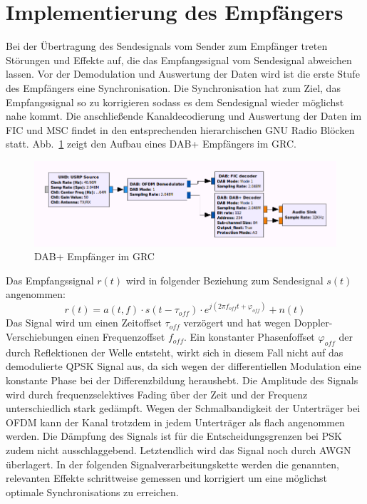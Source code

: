 \let\conjugatet\overline
\section{Implementierung des Empfängers}
\label{sec:impl_des_receivers}
Bei der Übertragung des Sendesignals vom Sender zum Empfänger treten Störungen und Effekte auf, die das Empfangssignal vom Sendesignal abweichen lassen. Vor der Demodulation und Auswertung der Daten wird ist die erste Stufe des Empfängers eine Synchronisation. Die Synchronisation hat zum Ziel, das Empfangssignal so zu korrigieren sodass es dem Sendesignal wieder möglichst nahe kommt. Die anschließende Kanaldecodierung und Auswertung der Daten im FIC und MSC findet in den entsprechenden hierarchischen GNU Radio Blöcken statt. Abb.~\ref{fig:grc_receiver} zeigt den Aufbau eines DAB+ Empfängers im GRC.

\begin{figure}[h]
\centering
  \includegraphics[width=\textwidth]{figures/GRC_receiver.png}
	\caption{DAB+ Empfänger im GRC}
	\label{fig:grc_receiver}
\end{figure}

Das Empfangssignal $r(t)$ wird in folgender Beziehung zum Sendesignal $s(t)$ angenommen:
\begin{equation}
r(t) = a(t,f) \cdot s(t-\tau_{off}) \cdot e^{j(2 \pi f_{off} t + \varphi_{off})} + n(t)
\end{equation}
Das Signal wird um einen Zeitoffset $\tau_{off}$ verzögert und hat wegen Doppler-Verschiebungen einen Frequenzoffset $f_{off}$. Ein konstanter Phasenfoffset $\varphi_{off}$ der durch Reflektionen der Welle entsteht, wirkt sich in diesem Fall nicht auf das demodulierte QPSK Signal aus, da sich wegen der differentiellen Modulation eine konstante Phase bei der Differenzbildung heraushebt.  Die Amplitude des Signals wird durch frequenzselektives Fading über der Zeit und der Frequenz unterschiedlich stark gedämpft. Wegen der Schmalbandigkeit der Unterträger bei OFDM kann der Kanal trotzdem in jedem Unterträger als flach angenommen werden. Die Dämpfung des Signals ist für die Entscheidungsgrenzen bei PSK zudem nicht ausschlaggebend. Letztendlich wird das Signal noch durch \ac{AWGN} überlagert. 
In der folgenden Signalverarbeitungskette werden die genannten, relevanten Effekte schrittweise gemessen und korrigiert um eine möglichst optimale Synchronisations zu erreichen.

